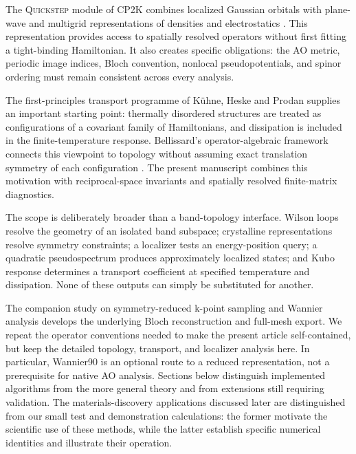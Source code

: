 \documentclass[11pt]{article}
\newcommand{\CPtwoK}{\textsc{CP2K}}
\newcommand{\Quickstep}{\textsc{Quickstep}}
\numberwithin{equation}{section}
\begin{document}
The \Quickstep{} module of \CPtwoK{} combines localized Gaussian orbitals
with plane-wave and multigrid representations of densities and
electrostatics \cite{Kuehne2020CP2K,Lippert1997,Lippert1999,VandeVondele2005a}.
This representation provides access to spatially resolved operators
without first fitting a tight-binding Hamiltonian. It also creates
specific obligations: the AO metric, periodic image indices, Bloch
convention, nonlocal pseudopotentials, and spinor ordering must remain
consistent across every analysis.

The first-principles transport programme of K\"uhne, Heske and Prodan
\cite{KuehneTransport2020} supplies an important starting point:
thermally disordered structures are treated as configurations of a
covariant family of Hamiltonians, and dissipation is included in the
finite-temperature response. Bellissard's operator-algebraic framework
connects this viewpoint to topology without assuming exact translation
symmetry of each configuration \cite{Bellissard1994,ProdanSchulzBaldes2016}.
The present manuscript combines this motivation with reciprocal-space
invariants and spatially resolved finite-matrix diagnostics.

The scope is deliberately broader than a band-topology interface.
Wilson loops resolve the geometry of an isolated band subspace;
crystalline representations resolve symmetry constraints; a localizer
tests an energy-position query; a quadratic pseudospectrum produces
approximately localized states; and Kubo response determines a
transport coefficient at specified temperature and dissipation.
None of these outputs can simply be substituted for another.

The companion study on symmetry-reduced k-point sampling and Wannier
analysis develops the underlying Bloch reconstruction and full-mesh
export. We repeat the operator conventions needed to make the present
article self-contained, but keep the detailed topology, transport, and
localizer analysis here. In particular, Wannier90 is an optional route
to a reduced representation, not a prerequisite for native AO analysis.
Sections below distinguish implemented algorithms from the more general
theory and from extensions still requiring validation.
The materials-discovery applications discussed later are distinguished
from our small test and demonstration calculations: the former motivate
the scientific use of these methods, while the latter establish specific
numerical identities and illustrate their operation.









\end{document}
